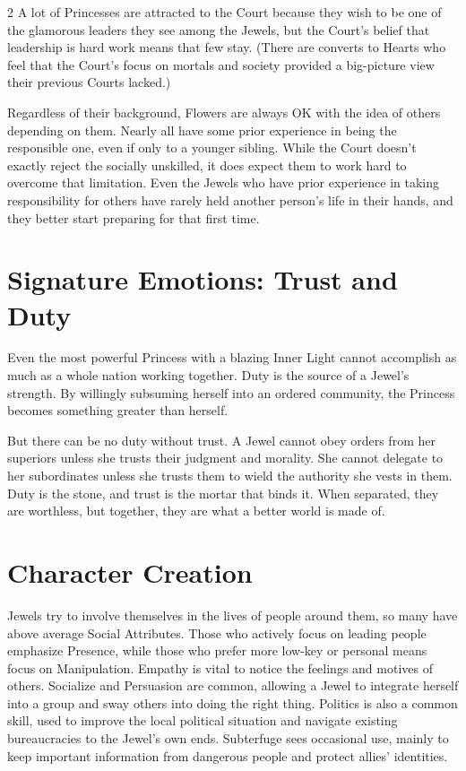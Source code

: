 \begin{multicols}{2}
A lot of Princesses are attracted to the Court because they wish to be one of the glamorous leaders they see among the Jewels, but the Court's belief that leadership is hard work means that few stay. (There are converts to Hearts who feel that the Court's focus on mortals and society provided a big-picture view their previous Courts lacked.) 

Regardless of their background, Flowers are always OK with the idea of others depending on them. Nearly all have some prior experience in being the responsible one, even if only to a younger sibling. While the Court doesn't exactly reject the socially unskilled, it does expect them to work hard to overcome that limitation. Even the Jewels who have prior experience in taking responsibility for others have rarely held another person's life in their hands, and they better start preparing for that first time. 

\section*{Signature Emotions: Trust and Duty}

Even the most powerful Princess with a blazing Inner Light cannot accomplish as much as a whole nation working together. Duty is the source of a Jewel's strength. By willingly subsuming herself into an ordered community, the Princess becomes something greater than herself. 

But there can be no duty without trust. A Jewel cannot obey orders from her superiors unless she trusts their judgment and morality. She cannot delegate to her subordinates unless she trusts them to wield the authority she vests in them. Duty is the stone, and trust is the mortar that binds it. When separated, they are worthless, but together, they are what a better world is made of.

\section*{Character Creation}
Jewels try to involve themselves in the lives of people around them, so many have above average Social Attributes. Those who actively focus on leading people emphasize Presence, while those who prefer more low-key or personal means focus on Manipulation. Empathy is vital to notice the feelings and motives of others. Socialize and Persuasion are common, allowing a Jewel to integrate herself into a group and sway others into doing the right thing. Politics is also a common skill, used to improve the local political situation and navigate existing bureaucracies to the Jewel's own ends. Subterfuge sees occasional use, mainly to keep important information from dangerous people and protect allies' identities. 


\end{multicols}
